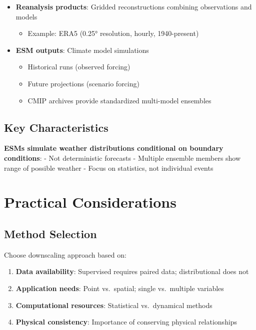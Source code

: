 \documentclass[
  letterpaper,
  DIV=11,
  numbers=noendperiod]{scrreprt}
\providecommand{\tightlist}{%
  \setlength{\itemsep}{0pt}\setlength{\parskip}{0pt}}
\begin{document}
\begin{itemize}
\tightlist
\item
  \textbf{Reanalysis products}: Gridded reconstructions combining
  observations and models

  \begin{itemize}
  \tightlist
  \item
    Example: ERA5 (0.25° resolution, hourly, 1940-present)
  \end{itemize}
\item
  \textbf{ESM outputs}: Climate model simulations

  \begin{itemize}
  \tightlist
  \item
    Historical runs (observed forcing)
  \item
    Future projections (scenario forcing)
  \item
    CMIP archives provide standardized multi-model ensembles
  \end{itemize}
\end{itemize}

\subsection{Key Characteristics}\label{key-characteristics}

\textbf{ESMs simulate weather distributions conditional on boundary
conditions}: - Not deterministic forecasts - Multiple ensemble members
show range of possible weather - Focus on statistics, not individual
events

\section{Practical Considerations}\label{practical-considerations-1}

\subsection{Method Selection}\label{method-selection}

Choose downscaling approach based on:

\begin{enumerate}
\def\labelenumi{\arabic{enumi}.}
\tightlist
\item
  \textbf{Data availability}: Supervised requires paired data;
  distributional does not
\item
  \textbf{Application needs}: Point vs.~spatial; single vs.~multiple
  variables
\item
  \textbf{Computational resources}: Statistical vs.~dynamical methods
\item
  \textbf{Physical consistency}: Importance of conserving physical
  relationships
\end{enumerate}
\end{document}
